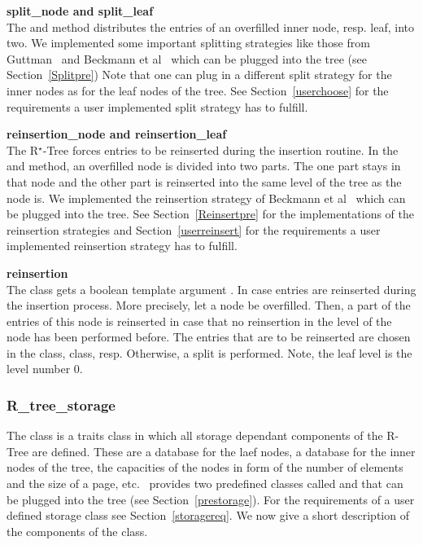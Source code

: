 \noindent
{\bf split\_node and split\_leaf}\\
\noindent
The  and  method distributes the
entries of an overfilled inner node, resp. leaf, into two.
We implemented some important splitting
strategies like those from Guttman~\cite{g-rtdis-84} and Beckmann
et al~\cite{bkss-rtera-90} which can be plugged into the
tree (see Section~\ref{Splitpre})
Note that one can plug in a different split strategy for the
inner nodes as for the leaf nodes of the tree.
See Section~\ref{userchoose} for the 
requirements a user implemented split strategy has to fulfill.
\medskip

\noindent
{\bf reinsertion\_node and reinsertion\_leaf}\\
\noindent
The R$^\star$-Tree forces entries to be reinserted during the
insertion routine. 
In the  and  method,
an overfilled node is divided into two parts. The one part stays
in that node and the other part is reinserted into the same level 
of the tree as the node is.
We implemented the
 reinsertion
strategy of  Beckmann
et al~\cite{bkss-rtera-90} which can be plugged into the
tree. See Section~\ref{Reinsertpre} for the implementations of
the reinsertion strategies and  Section~\ref{userreinsert} for the
requirements a user implemented reinsertion strategy has to fulfill.
\medskip

\noindent
{\bf reinsertion}\\
\noindent
\label{reinsertion} 
The  class gets a boolean template
  argument . In case 
  entries are reinserted during the insertion process. More
  precisely, let a node be overfilled. Then, a part of the
  entries of this node is reinserted in case that no reinsertion 
  in the level of the node has been performed before. The entries 
  that are to be reinserted are chosen in the 
  class,  class, resp. Otherwise, a split is 
  performed. Note, the leaf level is the level number 0.

\subsubsection{R\_tree\_storage}
The  class  is a traits class in which all
storage dependant components of the R-Tree are defined. These are 
a database for the laef nodes, a database for the inner nodes of
the tree, the capacities of the nodes in form of the number of
elements and the size of a page, etc. \cgal\ provides two
predefined  classes called
 and 
that can be plugged into the tree (see
Section~\ref{prestorage}). For the requirements of a user defined 
storage class see Section~\ref{storagereq}.
We now give a short description of the components of the
 class. 
\medskip

